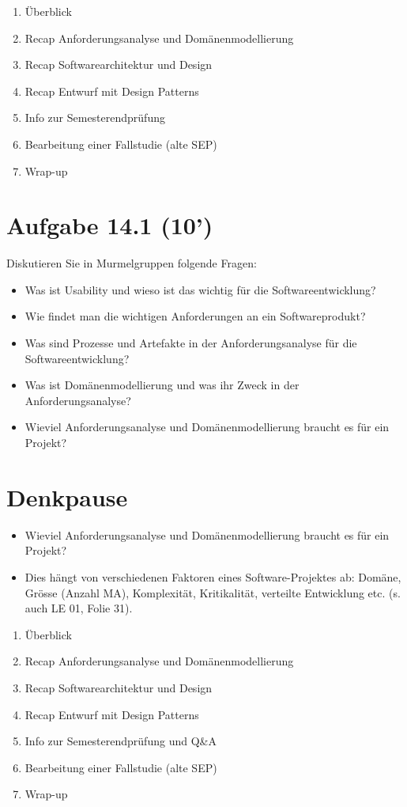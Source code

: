 \documentclass[10pt]{article}
\begin{document}
\begin{enumerate}
  \item Überblick
  \item Recap Anforderungsanalyse und Domänenmodellierung
  \item Recap Softwarearchitektur und Design
  \item Recap Entwurf mit Design Patterns
  \item Info zur Semesterendprüfung
  \item Bearbeitung einer Fallstudie (alte SEP)
  \item Wrap-up
\end{enumerate}

\section*{Aufgabe 14.1 (10')}
Diskutieren Sie in Murmelgruppen folgende Fragen:

\begin{itemize}
  \item Was ist Usability und wieso ist das wichtig für die Softwareentwicklung?
  \item Wie findet man die wichtigen Anforderungen an ein Softwareprodukt?
  \item Was sind Prozesse und Artefakte in der Anforderungsanalyse für die Softwareentwicklung?
  \item Was ist Domänenmodellierung und was ihr Zweck in der Anforderungsanalyse?
  \item Wieviel Anforderungsanalyse und Domänenmodellierung braucht es für ein Projekt?
\end{itemize}

\section*{Denkpause}
\begin{itemize}
  \item Wieviel Anforderungsanalyse und Domänenmodellierung braucht es für ein Projekt?
  \item Dies hängt von verschiedenen Faktoren eines Software-Projektes ab: Domäne, Grösse (Anzahl MA), Komplexität, Kritikalität, verteilte Entwicklung etc. (s. auch LE 01, Folie 31).
\end{itemize}

\begin{enumerate}
  \item Überblick
  \item Recap Anforderungsanalyse und Domänenmodellierung
  \item Recap Softwarearchitektur und Design
  \item Recap Entwurf mit Design Patterns
  \item Info zur Semesterendprüfung und Q\&A
  \item Bearbeitung einer Fallstudie (alte SEP)
  \item Wrap-up
\end{enumerate}
\end{document}
